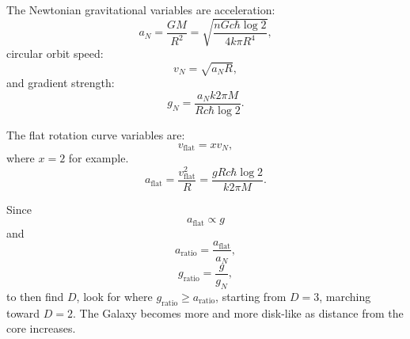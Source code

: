 \documentclass[12pt]{article}
\begin{document}
The Newtonian gravitational variables are acceleration:
\begin{equation}
a_N = \frac{G M}{R^2} = \sqrt{\frac{n G c \hbar \log 2}{4 k \pi R^4}},
\end{equation}
circular orbit speed:
\begin{equation}
v_N = \sqrt{a_N R},
\end{equation}
and gradient strength:
\begin{equation}
g_N = \frac{a_N k 2 \pi M}{R c \hbar \log 2}. 
\end{equation}

The flat rotation curve variables are:
\begin{equation}
v_{\textrm{flat}} = x v_N,
\end{equation}
where $x = 2$ for example.
\begin{equation}
a_{\textrm{flat}} = \frac{v_{\textrm{flat}}^2}{R} = \frac{g R c \hbar \log 2}{k 2 \pi M}.
\end{equation}

Since
\begin{equation}
a_{\textrm{flat}} \propto g
\end{equation}
and
\begin{equation}
a_{\textrm{ratio}} = \frac{a_{\textrm{flat}}}{a_N},
\end{equation}
\begin{equation}
g_{\textrm{ratio}} = \frac{g}{g_N},
\end{equation}
to then find $D$, look for where $g_{\textrm{ratio}} \geq a_{\textrm{ratio}}$, starting from $D = 3$, marching toward $D = 2$.
The Galaxy becomes more and more disk-like as distance from the core increases.
\end{document}
